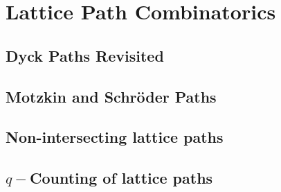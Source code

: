 \chapter{Lattice Path Combinatorics}



\section{Dyck Paths Revisited}

\section{Motzkin and Schr\"oder Paths}


\section{Non-intersecting lattice paths}


\section{\texorpdfstring{$q-$} CCounting of lattice paths}


\endinput

